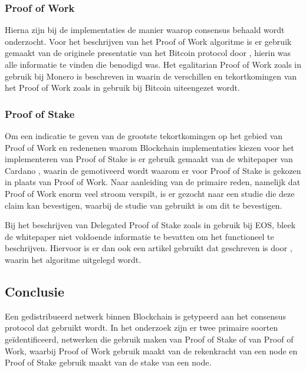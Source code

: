 \subsubsection{Proof of Work}
Hierna zijn bij de implementaties de manier waarop consensus behaald wordt onderzocht. Voor het beschrijven van het Proof of Work algoritme is er gebruik gemaakt van de originele presentatie van het Bitcoin protocol door \cite{nakamoto2008bitcoin}, hierin was alle informatie te vinden die benodigd was. Het egalitarian Proof of Work zoals in gebruik bij Monero is beschreven in \cite{van2013cryptonote} waarin de verschillen en tekortkomingen van het Proof of Work zoals in gebruik bij Bitcoin uiteengezet wordt.

\newpage
\subsubsection{Proof of Stake}
Om een indicatie te geven van de grootste tekortkomingen op het gebied van Proof of Work en redenenen waarom Blockchain implementaties kiezen voor het implementeren van Proof of Stake is er gebruik gemaakt van de whitepaper van Cardano \cite{kiayias2017ouroboros}, waarin de gemotiveerd wordt waarom er voor Proof of Stake is gekozen in plaats van Proof of Work. Naar aanleiding van de primaire reden, namelijk dat Proof of Work enorm veel stroom verspilt, is er gezocht naar een studie die deze claim kan bevestigen, waarbij de studie van \cite{ODwyer:Bitcoin} gebruikt is om dit te bevestigen.

Bij het beschrijven van Delegated Proof of Stake zoals in gebruik bij EOS, bleek de whitepaper niet voldoende informatie te bevatten om het functioneel te beschrijven. Hiervoor is er dan ook een artikel gebruikt dat geschreven is door \cite{steemit:eos_dpos}, waarin het algoritme uitgelegd wordt.

\subsection{Conclusie}

Een gedistribueerd netwerk binnen Blockchain is getypeerd aan het consensus protocol dat gebruikt wordt. In het onderzoek zijn er twee primaire soorten geïdentificeerd, netwerken die gebruik maken van Proof of Stake of van Proof of Work, waarbij Proof of Work gebruik maakt van de rekenkracht van een \gls{node} en Proof of Stake gebruik maakt van de \gls{stake} van een \gls{node}.